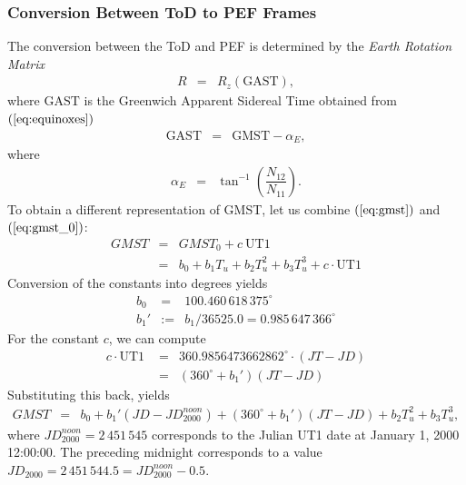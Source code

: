 \documentclass [12pt, a4paper] {article}
\begin{document}
\subsubsection{Conversion Between ToD to PEF Frames}
The conversion between the ToD and PEF is determined by the \emph{Earth Rotation Matrix}
\begin {eqnarray}
  R &=& R_z(\textrm{GAST}),
\end {eqnarray}
where $\textrm{GAST}$ is the Greenwich Apparent Sidereal Time obtained from 
$(\ref{eq:equinoxes})$
\begin {eqnarray}
  \textrm{GAST} &=& \textrm{GMST} - \alpha_E,
\end {eqnarray}
where
\begin {eqnarray}
  \label{eq:nutpar}
  \alpha_E &=& \tan^{-1}\left(
    \dfrac{N_{12}}{N_{11}}
  \right).
\end {eqnarray}
To obtain a different representation of GMST, let us combine $(\ref{eq:gmst})$ and 
$(\ref{eq:gmst_0})$:
\begin {eqnarray}
  GMST 
  &=& 
  GMST_0 + c\:\textrm{UT1} \\
  \nonumber
  &=&
  b_0 + b_1T_u + b_2T_u^2 + b_3T_u^3 + c\cdot\textrm{UT1}
\end {eqnarray}
Conversion of the constants into degrees yields
\begin {eqnarray}
  \nonumber
  b_0 &=& 100.460\,618\,375^\circ\\
  \nonumber
  b_1' &:=& b_1 / 36525.0 = 0.985\,647\,366^\circ %
\end {eqnarray}
For the constant $c$, we can compute
\begin {eqnarray}
  c\cdot\textrm{UT1
  } &=& 360.9856473662862^\circ\cdot(JT - JD) \\
  \nonumber 
  &=&
  (360^\circ + b_1')(JT - JD) 
\end {eqnarray}
Substituting this back, yields 
\begin {eqnarray}
  \nonumber
  GMST &=& b_0 + b_1'(JD - JD_{2000}^{noon}) + (360^\circ + b_1')(JT - JD) 
  + b_2T_u^2 + b_3T_u^3,
\end {eqnarray}
where $JD_{2000}^{noon}=2\,451\,545$ corresponds to the Julian UT1 date at January 1, 2000 12:00:00.
The preceding midnight corresponds to a value $JD_{2000} = 2\,451\,544.5 = JD_{2000}^{noon} -0.5$.
\end{document}
